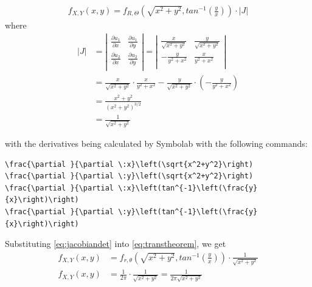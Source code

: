 \begin{equation}
\begin{split}
f_{X,Y}(x,y) = f_{R,\Theta}\left(\sqrt{x^2+y^2},tan^{-1}\left(\frac{y}{x}\right)\right) \cdot |J|
\end{split}
\label{eq:transtheorem}
\end{equation}
where 
\begin{equation}
\begin{split}
|J| &=
\left|
\begin{matrix}
\frac{\partial u_1}{\partial x} & 
\frac{\partial u_1}{\partial y}  \\[2ex] %
\frac{\partial u_2}{\partial x} & 
\frac{\partial u_2}{\partial y}  \\[2ex]
\end{matrix}
\right|
= 
\left|
\begin{matrix}
\frac{x}{\sqrt{x^2+y^2}}& 
\frac{y}{\sqrt{x^2+y^2}}  \\[2ex] %
-\frac{y}{y^2+x^2} & 
\frac{x}{y^2+x^2}  \\[2ex]
\end{matrix}
\right|\\[2ex]
&= \frac{x}{\sqrt{x^2+y^2}} \cdot \frac{x}{y^2+x^2} -\frac{y}{\sqrt{x^2+y^2}}  \cdot \left(-\frac{y}{y^2+x^2}\right)\\[2ex]
&= \frac{x^2+y^2}{(x^2+y^2)^{3/2}}\\[2ex]
&=\frac{1}{\sqrt{x^2+y^2}}
\end{split}
\label{eq:jacobiandet}
\end{equation}

with the derivatives being calculated by Symbolab \cite{symbolab} with the following commands:
\begin{lstlisting}
\frac{\partial }{\partial \:x}\left(\sqrt{x^2+y^2}\right)
\frac{\partial }{\partial \:y}\left(\sqrt{x^2+y^2}\right)
\frac{\partial }{\partial \:x}\left(tan^{-1}\left(\frac{y}{x}\right)\right)
\frac{\partial }{\partial \:y}\left(tan^{-1}\left(\frac{y}{x}\right)\right)
\end{lstlisting}

Substituting \ref{eq:jacobiandet} into \ref{eq:transtheorem}, we get
\begin{equation}
\begin{split}
f_{X,Y}(x,y) &= f_{r,\theta}\left(\sqrt{x^2+y^2},tan^{-1}\left(\frac{y}{x}\right)\right) \cdot \frac{1}{\sqrt{x^2+y^2}}\\[2ex]
f_{X,Y}(x,y) &= \frac{1}{2\pi} \cdot \frac{1}{\sqrt{x^2+y^2}} = \frac{1}{2\pi\sqrt{x^2+y^2}}
\end{split}
\label{eq:transtheoremcomplete}
\end{equation}

